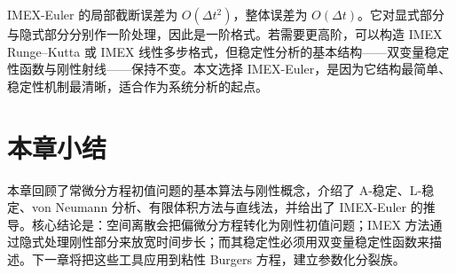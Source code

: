 IMEX-Euler 的局部截断误差为 $O(\Delta t^2)$，整体误差为 $O(\Delta t)$。它对显式部分与隐式部分分别作一阶处理，因此是一阶格式。若需要更高阶，可以构造 IMEX Runge--Kutta 或 IMEX 线性多步格式，但稳定性分析的基本结构——双变量稳定性函数与刚性射线——保持不变。本文选择 IMEX-Euler，是因为它结构最简单、稳定性机制最清晰，适合作为系统分析的起点。

\section{本章小结}

本章回顾了常微分方程初值问题的基本算法与刚性概念，介绍了 A-稳定、L-稳定、von Neumann 分析、有限体积方法与直线法，并给出了 IMEX-Euler 的推导。核心结论是：空间离散会把偏微分方程转化为刚性初值问题；IMEX 方法通过隐式处理刚性部分来放宽时间步长；而其稳定性必须用双变量稳定性函数来描述。下一章将把这些工具应用到粘性 Burgers 方程，建立参数化分裂族。
